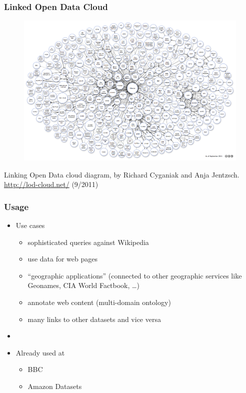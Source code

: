 \begin{frame}
\frametitle{Linked Open Data Cloud}
\centering
\begin{figure}
\includegraphics[scale=0.17]{img/lod-cloud.png}
\end{figure}
\small Linking Open Data cloud diagram, by Richard Cyganiak and Anja Jentzsch.
\url{http://lod-cloud.net/} (9/2011)
\end{frame}


\begin{frame}
\frametitle{Usage}
\begin{itemize}
  \item Use cases

	\begin{itemize}
	  \item sophisticated queries against Wikipedia
	  \item use data for web pages
	  \item ``geographic applications'' (connected to other geographic services
	  like Geonames, CIA World Factbook, \ldots)
	  \item annotate web content (multi-domain ontology)
	  \item many links to other datasets and vice versa
	\end{itemize}
	\item[]
	\item Already used at
	\begin{itemize}
	  \item BBC
	  \item Amazon Datasets
	 \end{itemize}
\end{itemize}
\end{frame}


